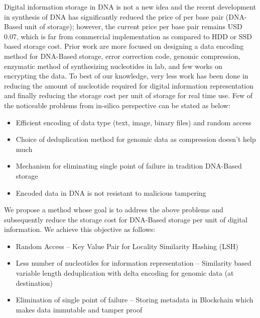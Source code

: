 \documentclass{article}
\begin{document}
Digital information storage in DNA is not a new idea and the recent development in synthesis of
DNA has significantly reduced the price of per base pair (DNA-Based unit of storage); however,
the current price per base pair remains USD 0.07, which is far from commercial implementation
as compared to HDD or SSD based storage cost. Prior work are more focused on designing a
data encoding method for DNA-Based storage, error correction code, genomic compression,
enzymatic method of synthesizing nucleotides in lab, and few works on encrypting the data.
To best of our knowledge, very less work has been done in reducing the amount of nucleotide
required for digital information representation and finally reducing the storage cost per unit of
storage for real time use.
Few of the noticeable problems from in-silico perspective can be stated as below: 

 

\begin{itemize} \itemsep 1pt

\item {Efficient encoding of data type (text, image, binary files) and random access}  

\item {Choice of deduplication method for genomic data as compression doesn’t help much }
\item {Mechanism for eliminating single point of failure in tradition DNA-Based storage }
\item {Encoded data in DNA is not resistant to malicious tampering }

\end{itemize}

We propose a method whose goal is to address the above problems and subsequently reduce
the storage cost for DNA-Based storage per unit of digital information. We achieve this objective
as follows: 

\begin{itemize} \itemsep 1pt

\item {Random Access – Key Value Pair for Locality Similarity Hashing (LSH)}  

\item {Less number of nucleotides for information representation – Similarity based variable
length deduplication with delta encoding for genomic data (at destination) }
\item {Elimination of single point of failure – Storing metadata in Blockchain which makes data
immutable and tamper proof }
\end{itemize}
\end{document}
